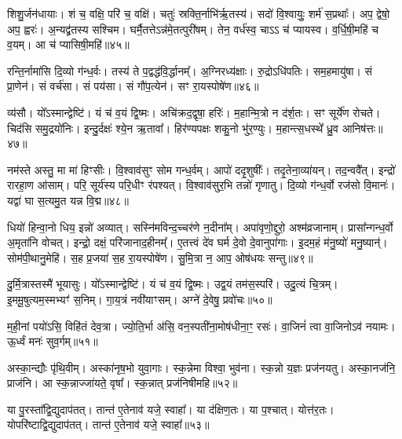 शिशु॒र्जन॑धायाः। 
शं च॒ वक्षि॒ परि॑ च॒ वक्षि॑। 
चतुः॑ स्रक्ति॒र्नाभि॑र्\mbox{}ऋ॒तस्य॑। 
सदो॑ वि॒श्वायुः॒ शर्म॑ स॒प्रथाः᳚। 
अप॒ द्वेषो॒ अप॒ ह्वरः॑। 
अ॒न्यद्व्र॑तस्य सश्चिम। 
घर्मै॒तत्तेऽन्न॑मे॒तत्पुरी॑षम्। 
तेन॒ वर्ध॑स्व॒ चाऽऽ च॑ प्यायस्व। 
व॒र्धि॒षी॒महि॑ च व॒यम्। 
आ च॑ प्यासिषी॒महि॑॥४५॥

रन्ति॒र्नामा॑सि दि॒व्यो ग॑न्ध॒र्वः। 
तस्य॑ ते प॒द्वद्ध॑वि॒र्द्धानम्᳚। 
अ॒ग्निरध्य॑क्षाः। 
रु॒द्रोऽधि॑पतिः। 
सम॒हमायु॑षा। 
सं प्रा॒णेन॑। 
सं वर्च॑सा। 
सं पय॑सा। 
सं गौ॑प॒त्येन॑। 
सꣳ रा॒यस्पोषे॑ण॥४६॥

व्य॑सौ। 
यो᳚ऽस्मान्द्वेष्टि॑। 
यं च॑ व॒यं द्वि॒ष्मः। 
अचि॑क्रद॒द्वृषा॒ हरिः॑। 
म॒हान्मि॒त्रो न द॑र्\mbox{}श॒तः। 
सꣳ सूर्ये॑ण रोचते। 
चिद॑सि समु॒द्रयो॑निः। 
इन्दु॒र्दक्षः॑ श्ये॒न ऋ॒तावा᳚। 
हिर॑ण्यपक्षः  शकु॒नो भु॑र॒ण्युः। 
म॒हान्त्स॒धस्थे᳚ ध्रु॒व आनिष॑त्तः॥४७॥

नम॑स्ते अस्तु॒ मा मा॑ हिꣳसीः। 
वि॒श्वाव॑सुꣳ सोम गन्ध॒र्वम्। 
आपो॑ ददृ॒शुषीः᳚। 
तदृ॒तेना॒व्या॑यन्। 
तद॒न्ववै᳚त्। 
इन्द्रो॑ रारहा॒ण आ॑साम्। 
परि॒ सूर्य॑स्य परि॒धीꣳ र॑पश्यत्। 
वि॒श्वाव॑सुर॒भि तन्नो॑ गृणातु। 
दि॒व्यो ग॑न्ध॒र्वो रज॑सो वि॒मानः॑। 
यद्वा॑ घा स॒त्यमु॒त यन्न वि॒द्म॥४८॥

धियो॑ हिन्वा॒नो धिय॒ इन्नो॑ अव्यात्। 
सस्नि॑मविन्द॒च्चर॑णे न॒दीना᳚म्। 
अपा॑वृणो॒द्दुरो॒ अश्म॑व्रजानाम्। 
प्रासा᳚न्गन्ध॒र्वो अ॒मृता॑नि वोचत्। 
इन्द्रो॒ दक्षं॒ परि॑जानाद॒हीनम्᳚। 
ए॒तत्त्वं दे॑व घर्म दे॒वो दे॒वानुपा॑गाः। 
इ॒दम॒हं म॑नु॒ष्यो॑ मनु॒ष्यान्॑। 
सोम॑पी॒थानु॒मेहि॑। 
स॒ह प्र॒जया॑ स॒ह रा॒यस्पोषे॑ण। 
सु॒मि॒त्रा न॒ आप॒ ओष॑धयः सन्तु॥४९॥

दु॒र्मि॒त्रास्तस्मै॑ भूयासुः। 
यो᳚ऽस्मान्द्वेष्टि॑। 
यं च॑ व॒यं द्वि॒ष्मः। 
उद्व॒यं तम॑स॒स्परि॑। 
उदु॒त्यं चि॒त्रम्। 
इ॒ममू॒षुत्यम॒स्मभ्यꣳ॑ स॒निम्। 
गा॒य॒त्रं नवी॑याꣳसम्। 
अग्ने॑ दे॒वेषु॒ प्रवो॑चः॥५०॥
\anuvakamend[याऽऽग्नी᳚ध्रे॒ तान्त॑ ए॒तेनाव॑ यजे॒ स्वाहा॒ धर्म॑णा शं॒ युधा॑याः प्यासिषी॒महि॒ पोषे॑ण॒ निष॑त्तो वि॒द्म स॑न्त्व॒ष्टौ]

म॒ही॒नां पयो॑ऽसि॒ विहि॑तं देव॒त्रा। 
ज्यो॒ति॒र्भा अ॑सि॒ वन॒स्पती॑ना॒\-मोष॑धीना॒ꣳ॒ रसः॑। 
वा॒जिनं॑ त्वा वा॒जिनोऽव॑ नयामः। 
ऊ॒र्ध्वं मनः॑ सुव॒र्गम्॥५१॥
\anuvakamend

अस्का॒न्द्यौः पृ॑थि॒वीम्। 
अस्का॑नृष॒भो युवा॒गाः। 
स्क॒न्नेमा विश्वा॒ भुव॑ना। 
स्क॒न्नो य॒ज्ञः प्रज॑नयतु। 
अस्का॒नज॑नि॒ प्राज॑नि। 
आ स्क॒न्नाज्जा॑यते॒ वृषा᳚। 
स्क॒न्नात् प्रज॑निषीमहि॥५२॥
\anuvakamend

या पु॒रस्ता᳚द्वि॒द्युदाप॑तत्। 
तान्त॑ ए॒तेनाव॑ यजे॒ स्वाहा᳚। 
या द॑क्षिण॒तः। 
या प॒श्चात्। 
योत्त॑र॒तः। 
योपरि॑ष्टाद्वि॒द्युदाप॑तत्। 
तान्त॑ ए॒तेनाव॑ यजे॒ स्वाहा᳚॥५३॥
\anuvakamend

